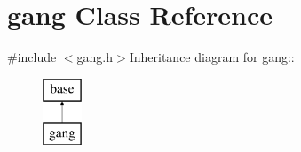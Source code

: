 \hypertarget{classgang}{
\section{gang Class Reference}
\label{classgang}
}


{\ttfamily \#include $<$gang.h$>$}Inheritance diagram for gang::\begin{figure}[H]
\begin{center}
\leavevmode
\includegraphics[height=2cm]{classgang}
\end{center}
\end{figure}
